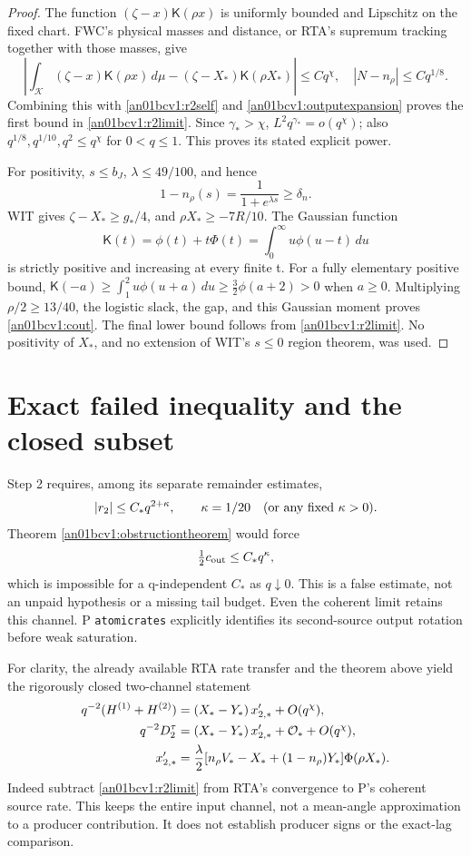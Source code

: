 \documentclass[11pt]{article}
\newcommand{\dd}{\,d}
\newcommand{\K}{\mathcal K}
\newcommand{\kf}{\mathsf K}
\begin{document}
\begin{proof}
The function \((\zeta-x)\kf(\rho x)\) is uniformly bounded and
Lipschitz on the fixed chart. FWC's physical masses and distance,
or RTA's supremum tracking together with those masses, give
\[
 \left|\int_\K(\zeta-x)\kf(\rho x)\dd\mu
           -(\zeta-X_*)\kf(\rho X_*)\right|\le Cq^\chi,
 \quad |N-n_\rho|\le Cq^{1/8}.
\]
Combining this with \eqref{an01bcv1:r2self} and
\eqref{an01bcv1:outputexpansion} proves the first bound in
\eqref{an01bcv1:r2limit}. Since \(\gamma_*>\chi\),
\(L^2q^{\gamma_*}=o(q^\chi)\); also
\(q^{1/8},q^{1/10},q^2\le q^\chi\) for \(0<q\le1\).
This proves its stated explicit power.

For positivity, \(s\le b_J\), \(\lambda\le49/100\), and hence
\[
 1-n_\rho(s)=\frac1{1+e^{\lambda s}}\ge\delta_n.
\]
WIT gives \(\zeta-X_*\ge g_*/4\), and
\(\rho X_*\ge-7R/10\). The Gaussian function
\[
 \kf(t)=\phi(t)+t\Phi(t)=\int_0^\infty u\phi(u-t)\dd u
\]
is strictly positive and increasing at every finite t.
For a fully elementary positive bound,
\(\kf(-a)\ge\int_1^2u\phi(u+a)\dd u
\ge\tfrac32\phi(a+2)>0\) when \(a\ge0\).
Multiplying \(\rho/2\ge13/40\), the logistic slack, the gap,
and this Gaussian moment proves \eqref{an01bcv1:cout}.
The final lower bound follows from \eqref{an01bcv1:r2limit}.
No positivity of \(X_*\), and no extension of WIT's \(s\le0\)
region theorem, was used.
\end{proof}

\section{Exact failed inequality and the closed subset}
\label{an01bcv1:stop}
Step 2 requires, among its separate remainder estimates,
\begin{equation}
 |r_2|\le C_*q^{2+\kappa},\qquad \kappa=1/20
 \quad\hbox{(or any fixed \(\kappa>0\))}.
 \label{an01bcv1:failed}
\end{equation}
Theorem \ref{an01bcv1:obstructiontheorem} would force
\[
 \tfrac12c_{\rm out}\le C_*q^\kappa,
\]
which is impossible for a q-independent \(C_*\) as \(q\downarrow0\).
This is a false estimate, not an unpaid hypothesis or a missing
tail budget. Even the coherent limit retains this channel.
P \texttt{atomicrates} explicitly identifies its second-source
output rotation before weak saturation.

For clarity, the already available RTA rate transfer and the theorem
above yield the rigorously closed two-channel statement
\begin{align}
 q^{-2}(H^{(1)}+H^{(2)})
       &=(X_*-Y_*)\,x'_{2,*}+O(q^\chi),\notag\\
 q^{-2}D_2^\tau
       &=(X_*-Y_*)\,x'_{2,*}+\mathcal O_*+O(q^\chi),
 \label{an01bcv1:twoway}\\
 x'_{2,*}
       &=\frac{\lambda}{2}
       [n_\rho V_*-X_*+(1-n_\rho)Y_*]\Phi(\rho X_*).\notag
\end{align}
Indeed subtract \eqref{an01bcv1:r2limit} from RTA's convergence
to P's coherent source rate. This keeps the entire input channel,
not a mean-angle approximation to a producer contribution.
It does not establish producer signs or the exact-lag comparison.
\end{document}
